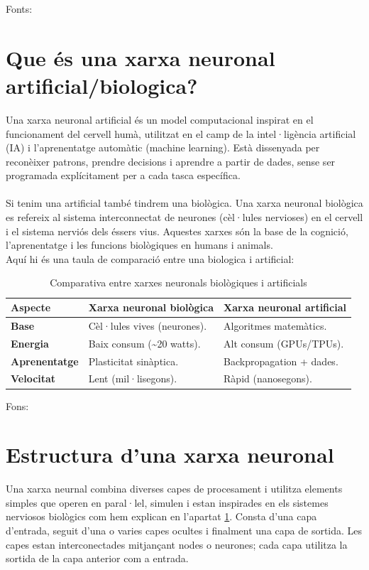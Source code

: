 Fonts: ~\cite{Universitat_oberta_catalunya} ~\cite{Generalitat} ~\cite{IBM_machine_learning} ~\cite{
Ultralytics} ~\cite{bengio2012} ~\cite{Ai_Act} ~\cite{Unesco}

\section{Que és una xarxa neuronal artificial/biologica?}\label{sec:xarxa neuronal}
Una xarxa neuronal artificial és un model computacional inspirat en el funcionament del cervell humà, utilitzat en el camp de la intel·ligència artificial (IA) i l'aprenentatge automàtic (machine learning). Està dissenyada per reconèixer patrons, prendre decisions i aprendre a partir de dades, sense ser programada explícitament per a cada tasca específica.\\ \\
Si tenim una artificial també tindrem una biològica. Una xarxa neuronal biològica es refereix al sistema interconnectat de neurones (cèl·lules nervioses) en el cervell i el sistema nerviós dels éssers vius. Aquestes xarxes són la base de la cognició, l'aprenentatge i les funcions biològiques en humans i animals.\\
Aquí hi és una taula de comparació entre una biologica i artificial:

\begin{table}[h!]
\begin{tabular}{|l|l|l|}
\hline
\textbf{Aspecte} & \textbf{Xarxa neuronal biològica} & \textbf{Xarxa neuronal artificial} \\ \hline
\textbf{Base} & Cèl·lules vives (neurones). & Algoritmes matemàtics. \\ \hline
\textbf{Energia} & Baix consum (\textasciitilde20 watts). & Alt consum (GPUs/TPUs). \\ \hline
\textbf{Aprenentatge} & Plasticitat sinàptica. & Backpropagation + dades. \\ \hline
\textbf{Velocitat} & Lent (mil·lisegons). & Ràpid (nanosegons). \\ \hline
\end{tabular}
\caption{Comparativa entre xarxes neuronals biològiques i artificials}
\end{table}
Fons:~\cite{IBM_Xarxa}
\section{Estructura d'una xarxa neuronal}\label{sec:3.6}
Una xarxa neurnal combina diverses capes de procesament i utilitza elements simples que operen en paral·lel, simulen i estan inspirades en els sistemes nerviosos biològics com hem explican en l'apartat \ref{sec:xarxa neuronal}. Consta d'una capa d'entrada, seguit d'una o varies capes ocultes i finalment una capa de sortida. Les capes estan interconectades mitjançant nodes o neurones; cada capa utilitza la sortida de la capa anterior com a entrada.

